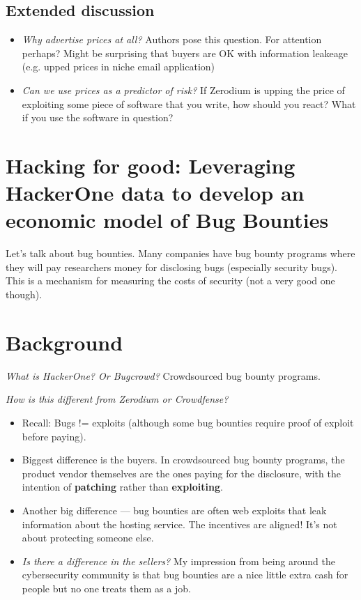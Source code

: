 \documentclass[11pt]{article}
\begin{document}
\subsection{Extended discussion}


\begin{itemize}
    \item {\it Why advertise prices at all?} Authors pose this question. For attention perhaps? Might be surprising that buyers are OK with information leakeage (e.g. upped prices in niche email application)
    \item {\it Can we use prices as a predictor of risk?} If Zerodium is upping the price of exploiting some piece of software that you write, how should you react? What if you use the software in question?
\end{itemize}

\section{Hacking for good: Leveraging HackerOne data to develop an economic model of Bug Bounties}

Let's talk about bug bounties. Many companies have bug bounty programs where they will pay researchers money for disclosing bugs (especially security bugs). This is a mechanism for measuring the costs of security (not a very good one though).


\section{Background}

{\it What is HackerOne? Or Bugcrowd?} Crowdsourced bug bounty programs. 

{\it How is this different from Zerodium or Crowdfense?} 
\begin{itemize}
    \item Recall: Bugs != exploits (although some bug bounties require proof of exploit before paying). 
    \item Biggest difference is the buyers. In crowdsourced bug bounty programs, the product vendor themselves are the ones paying for the disclosure, with the intention of {\bf patching} rather than {\bf exploiting}.
    \item Another big difference --- bug bounties are often web exploits that leak information about the hosting service. The incentives are aligned! It's not about protecting someone else. 
    \item {\it Is there a difference in the sellers?} My impression from being around the cybersecurity community is that bug bounties are a nice little extra cash for people but no one treats them as a job. 
\end{itemize}
\end{document}
